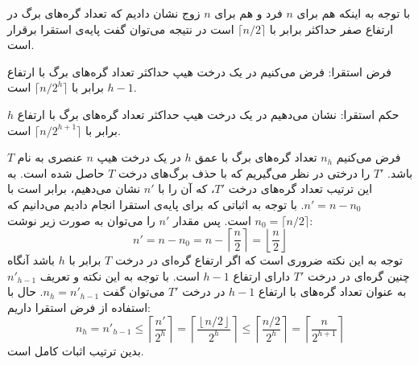 با توجه به اینکه هم برای {$n$} فرد و هم برای {$n$} زوج نشان دادیم که تعداد گره‌های برگ در ارتفاع صفر حداکثر برابر با {$\lceil n/2\rceil$} است در نتیجه می‌توان گفت پایه‌ی استقرا برقرار است.

فرض استقرا: فرض می‌کنیم در یک درخت هیپ حداکثر تعداد گره‌های برگ با ارتفاع {$h-1$} برابر با {$\lceil n/2^{h}\rceil$} است.

حکم استقرا: نشان می‌دهیم در یک درخت هیپ حداکثر تعداد گره‌های برگ با ارتفاع {$h$} برابر با {$\lceil n/2^{h+1}\rceil$} است.

فرض می‌کنیم {$n_h$} تعداد گره‌های برگ با عمق {$h$} در یک درخت هیپ {$n$} عنصری به نام {$T$} باشد. {$T'$} را درختی در نظر می‌گیریم که با حذف برگ‌های درخت {$T$} حاصل شده است. به این ترتیب تعداد گره‌های درخت {$T'$}، که آن را با {$n'$} نشان می‌دهیم، برابر است با {$n'=n-n_0$}. با توجه به اثباتی که برای پایه‌ی استقرا انجام دادیم می‌دانیم که {$n_0=\lceil n/2 \rceil$} است. پس مقدار {$n'$} را می‌توان به صورت زیر نوشت:
\begin{displaymath}
n' = n - n_0=n-\left\lceil \frac{n}{2}\right\rceil =\left\lfloor \frac{n}{2}\right\rfloor
\end{displaymath}
توجه به این نکته ضروری است که اگر ارتفاع گره‌ای در درخت {$T$} برابر با {$h$} باشد آنگاه چنین گره‌ای در درخت {$T'$} دارای ارتفاع {$h-1$} است. با توجه به این نکته و تعریف {${n'}_{h-1}$} به ‌عنوان تعداد گره‌های با ارتفاع {$h-1$} در درخت {$T'$} می‌توان گفت {$n_h=n'_{h-1}$}. حال با استفاده از فرض استقرا داریم:
\begin{displaymath}
n_h=n'_{h-1} \leq \left\lceil \frac{n'}{2^h}\right\rceil=\left\lceil \frac{\left\lfloor n/2 \right\rfloor}{2^h}\right\rceil \leq \left\lceil \frac{n/2}{2^h}\right\rceil=\left\lceil \frac{n}{2^{h+1}} \right\rceil
\end{displaymath}
بدین ترتیب اثبات کامل است.